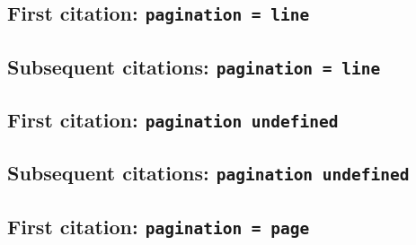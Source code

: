 \documentclass[a4paper]{article}
\begin{document}
\cite{heraclitus:epistle1}

\cite[577]{heraclitus:epistle1}

\cite[note]{heraclitus:epistle1}

\subsection{First citation: \texttt{pagination = line}}

\cite{heraclitus:epistle1:a}

\citereset
\cite[10]{heraclitus:epistle1:a}

\citereset
\cite[note]{heraclitus:epistle1:a}

\subsection{Subsequent citations: \texttt{pagination = line}}

\cite{heraclitus:epistle1:a}

\cite[10]{heraclitus:epistle1:a}

\cite[note]{heraclitus:epistle1:a}

\subsection{First citation: \texttt{pagination undefined}}

\cite{augustine:letters}

\citereset
\cite[10]{augustine:letters}

\citereset
\AtNextCite{\renewcommand*{\volcitedelim}{\addcomma\space}}
\cite[note]{augustine:letters}

\subsection{Subsequent citations: \texttt{pagination undefined}}

\cite{augustine:letters}

\cite[10]{augustine:letters}

\cite[note]{augustine:letters}

\subsection{First citation: \texttt{pagination = page}}

\cite{augustine:letters:a}

\citereset
\cite[10]{augustine:letters:a}
\end{document}
